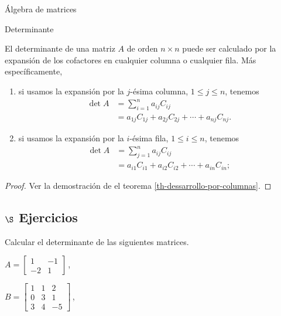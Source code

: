 \begin{chapter}{\'Algebra de matrices}
\begin{section}{Determinante}
    
    \begin{teorema} \label{th-expancion-cofactores} El determinante de una matriz $A$ de orden $n \times n$ puede ser calculado por la expansión de los cofactores en  cualquier columna o cualquier fila. Más específicamente, 
        \begin{enumerate}
            \item si usamos la expansión por la $j$-ésima columna, $1 \le j \le n$, tenemos
            \begin{align*}
            \det A &= \sum_{i=1}^{n} a_{ij} C_{ij} \\
            & = a_{1j}C_{1j}+a_{2j}C_{2j}+\cdots+a_{nj}C_{nj}.
            \end{align*} 
            \item si usamos la expansión por la $i$-ésima fila, $1 \le i \le n$, tenemos
            \begin{align*}
            \det A &= \sum_{j=1}^{n} a_{ij} C_{ij} \\
            & = a_{i1}C_{i1}+a_{i2}C_{i2}+\cdots+a_{in}C_{in};
            \end{align*} 
        \end{enumerate}
    \end{teorema}
\begin{proof}
    Ver la demostración de el teorema  \ref{th-dessarrollo-por-columnas}.
\end{proof}

\subsection*{$\S$ Ejercicios}
\begin{enumex}
    \item Calcular el determinante de las siguientes matrices.
        \begin{enumex}
            \begin{minipage}{0.4\textwidth}
            \item $A=\begin{bmatrix}
                1&-1\\-2&1 
            \end{bmatrix}$\,,
        \end{minipage}
        \begin{minipage}{0.4\textwidth}
            \item $B=\begin{bmatrix}
                1&1&2\\0&3&1\\3&4&-5
            \end{bmatrix}$\,,
        \end{minipage}


\end{enumex}
\end{enumex}
\end{section}
\end{chapter}
